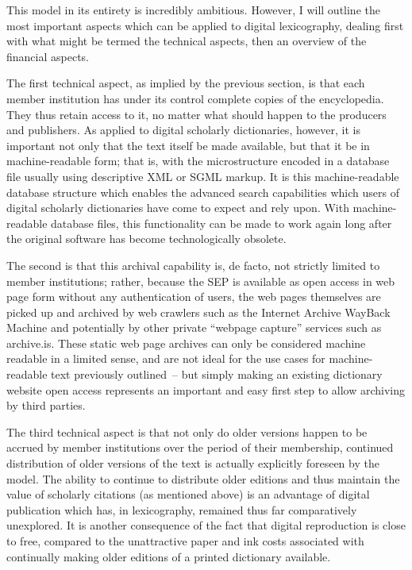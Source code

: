 \documentclass[output=paper]{langscibook}
\begin{document}
This model in its entirety is incredibly ambitious. However, I will
outline the most important aspects which can be applied to digital
lexicography, dealing first with what might be termed the technical
aspects, then an overview of the financial aspects.

The first technical aspect, as implied by the previous section, is that
each member institution has under its control complete copies of the
encyclopedia. They thus retain access to it, no matter what should
happen to the producers and publishers. As applied to digital scholarly
dictionaries, however, it is important not only that the text itself be
made available, but that it be in machine-readable form; that is, with
the microstructure encoded in a database file usually using descriptive
XML or SGML markup. It is this machine-readable database structure which
enables the advanced search capabilities which users of digital
scholarly dictionaries have come to expect and rely upon. With
machine-readable database files, this functionality can be made to work
again long after the original software has become technologically
obsolete.

The second is that this archival capability is, de facto, not strictly
limited to member institutions; rather, because the SEP is
available as open access in web page form without any authentication of
users, the web pages themselves are picked up and archived by web
crawlers such as the Internet Archive WayBack Machine and potentially by
other private “webpage capture” services such as archive.is. These
static web page archives can only be considered machine readable in a
limited sense, and are not ideal for the use cases for machine-readable
text previously outlined~-- but simply making an existing dictionary
website open access represents an important and easy first step to allow
archiving by third parties.

The third technical aspect is that not only do older versions happen to
be accrued by member institutions over the period of their membership,
continued distribution of older versions of the text is actually
explicitly foreseen by the model. The ability to continue to distribute
older editions and thus maintain the value of scholarly citations (as
mentioned above) is an advantage of digital publication which has, in
lexicography, remained thus far comparatively unexplored. It is another
consequence of the fact that digital reproduction is close to free,
compared to the unattractive paper and ink costs associated with
continually making older editions of a printed dictionary available.
\end{document}
